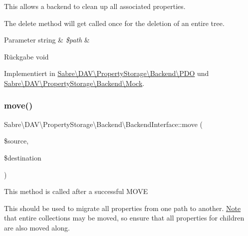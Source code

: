 This allows a backend to clean up all associated properties.

The delete method will get called once for the deletion of an entire tree.


\begin{DoxyParams}[1]{Parameter}
string & {\em \$path} & \\
\hline
\end{DoxyParams}
\begin{DoxyReturn}{Rückgabe}
void 
\end{DoxyReturn}


Implementiert in \mbox{\hyperlink{class_sabre_1_1_d_a_v_1_1_property_storage_1_1_backend_1_1_p_d_o_a4a9b088694e295dba8ad668e85808d7f}{Sabre\textbackslash{}\+D\+A\+V\textbackslash{}\+Property\+Storage\textbackslash{}\+Backend\textbackslash{}\+P\+DO}} und \mbox{\hyperlink{class_sabre_1_1_d_a_v_1_1_property_storage_1_1_backend_1_1_mock_a6c1045261abf7f52248c8f0b217f90ae}{Sabre\textbackslash{}\+D\+A\+V\textbackslash{}\+Property\+Storage\textbackslash{}\+Backend\textbackslash{}\+Mock}}.

\mbox{\label{interface_sabre_1_1_d_a_v_1_1_property_storage_1_1_backend_1_1_backend_interface_a6ada599e02c26b6452b0b06b78d48505}} 
\subsubsection{\texorpdfstring{move()}{move()}}
{\footnotesize\ttfamily Sabre\textbackslash{}\+D\+A\+V\textbackslash{}\+Property\+Storage\textbackslash{}\+Backend\textbackslash{}\+Backend\+Interface\+::move (\begin{DoxyParamCaption}\item[{}]{\$source,  }\item[{}]{\$destination }\end{DoxyParamCaption})}

This method is called after a successful M\+O\+VE

This should be used to migrate all properties from one path to another. \mbox{\hyperlink{class_note}{Note}} that entire collections may be moved, so ensure that all properties for children are also moved along.


